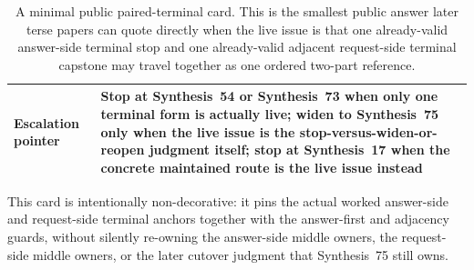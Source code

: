 \documentclass[11pt]{article}
\begin{document}
\begin{table}[t]
\begin{tabularx}{\linewidth}{@{}lX@{}}
Escalation pointer & Stop at Synthesis~54 or Synthesis~73 when only one terminal form is actually live; widen to Synthesis~75 only when the live issue is the stop-versus-widen-or-reopen judgment itself; stop at Synthesis~17 when the concrete maintained route is the live issue instead \\
\bottomrule
\end{tabularx}
\caption{A minimal public paired-terminal card. This is the smallest public answer later terse papers can quote directly when the live issue is that one already-valid answer-side terminal stop and one already-valid adjacent request-side terminal capstone may travel together as one ordered two-part reference.}
\label{tab:minimal-public-paired-terminal-card}
\end{table}

This card is intentionally non-decorative: it pins the actual worked answer-side and request-side terminal anchors together with the answer-first and adjacency guards, without silently re-owning the answer-side middle owners, the request-side middle owners, or the later cutover judgment that Synthesis~75 still owns.\cite{series:workedexample}
\end{document}
